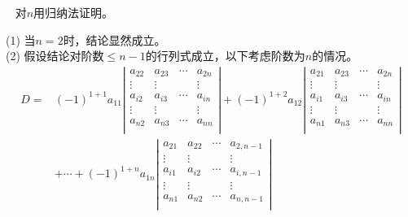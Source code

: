 \begin{frame}
~ 
  对$n$用归纳法证明。 \\[0.1in]\pause
  
  \noindent (1) 当$n=2$时，结论显然成立。\\[0.1in]\pause
  \noindent (2) 假设结论对阶数$\le n-1$的行列式成立，以下考虑阶数为$n$的情况。
    $$
    \begin{aligned}
      D = &  (-1)^{1+1} a_{11} \left|
        \begin{array}{cccc}
          a_{22}  & a_{23}   & \cdots & a_{2n}\\
          \vdots  & \vdots & & \vdots \\
          a_{i2}  & a_{i3}   & \cdots & a_{in}\\
          \vdots & \vdots  & & \vdots \\
          a_{n2}  & a_{n3}   & \cdots & a_{nn}\\
        \end{array}
      \right| + (-1)^{1+2} a_{12} \left|
        \begin{array}{cccc}
          a_{21}  & a_{23}  & \cdots & a_{2n}\\
          \vdots & \vdots & & \vdots \\
          a_{i1}  & a_{i3}  & \cdots & a_{in}\\
          \vdots & \vdots & & \vdots \\
          a_{n1}  & a_{n3}  & \cdots & a_{nn}\\
        \end{array}
      \right|\\
      & 
      + \cdots  
      + (-1)^{1+n} a_{1n} \left|
        \begin{array}{cccc}
          a_{21}  & a_{22}   & \cdots & a_{2,n-1}\\
          \vdots  & \vdots & & \vdots \\
          a_{i1}  & a_{i2}   & \cdots & a_{i,n-1}\\
          \vdots & \vdots  & & \vdots \\
          a_{n1}  & a_{n2}   & \cdots & a_{n,n-1}\\
        \end{array}
      \right|
    \end{aligned}
    $$
\end{frame}

